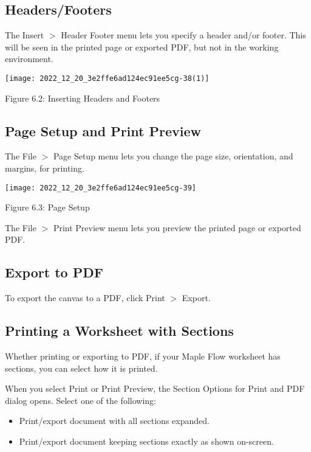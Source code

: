 \subsection{Headers/Footers}
The Insert $>$ Header Footer menu lets you specify a header and/or footer. This will be seen in the printed page or exported PDF, but not in the working environment.

\begin{center}
\texttt{[image: 2022\_12\_20\_3e2ffe6ad124ec91ee5cg-38(1)]}
\end{center}

Figure 6.2: Inserting Headers and Footers

\subsection{Page Setup and Print Preview}
The File $>$ Page Setup menu lets you change the page size, orientation, and margins, for printing.

\begin{center}
\texttt{[image: 2022\_12\_20\_3e2ffe6ad124ec91ee5cg-39]}
\end{center}

Figure 6.3: Page Setup

The File $>$ Print Preview menu lets you preview the printed page or exported PDF.

\subsection{Export to PDF}
To export the canvas to a PDF, click Print $>$ Export.

\subsection{Printing a Worksheet with Sections}
Whether printing or exporting to PDF, if your Maple Flow worksheet has sections, you can select how it is printed.

When you select Print or Print Preview, the Section Options for Print and PDF dialog opens. Select one of the following:

\begin{itemize}
  \item Print/export document with all sections expanded.

  \item Print/export document keeping sections exactly as shown on-screen.

\end{itemize}

